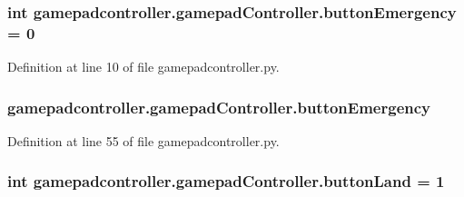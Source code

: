 \hypertarget{classgamepadcontroller_1_1gamepadController_af4f9816a1459785ead61211c503b99b8}{
\subsubsection[{button\-Emergency}]{\setlength{\rightskip}{0pt plus 5cm}int gamepadcontroller.\-gamepad\-Controller.\-button\-Emergency = 0\hspace{0.3cm}{\ttfamily [static]}}}\label{classgamepadcontroller_1_1gamepadController_af4f9816a1459785ead61211c503b99b8}


Definition at line 10 of file gamepadcontroller.\-py.

\hypertarget{classgamepadcontroller_1_1gamepadController_a59a38e68ed8c9b0e1c5e2a84987dd1db}{
\subsubsection[{button\-Emergency}]{\setlength{\rightskip}{0pt plus 5cm}gamepadcontroller.\-gamepad\-Controller.\-button\-Emergency}}\label{classgamepadcontroller_1_1gamepadController_a59a38e68ed8c9b0e1c5e2a84987dd1db}


Definition at line 55 of file gamepadcontroller.\-py.

\hypertarget{classgamepadcontroller_1_1gamepadController_aa6a3832d0061812df791a90a098667a9}{
\subsubsection[{button\-Land}]{\setlength{\rightskip}{0pt plus 5cm}int gamepadcontroller.\-gamepad\-Controller.\-button\-Land = 1\hspace{0.3cm}{\ttfamily [static]}}}\label{classgamepadcontroller_1_1gamepadController_aa6a3832d0061812df791a90a098667a9}


